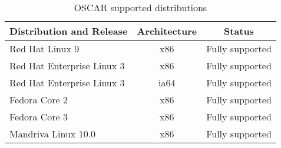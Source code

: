 %
%
%

\begin{table}[htbp]
  \begin{center}
    \begin{tabular}{|l|c|p{3in}|}
      \hline
      \multicolumn{1}{|c|}{Distribution and Release} &
      \multicolumn{1}{|c|}{Architecture} &
      \multicolumn{1}{|c|}{Status} \\
      \hline
      \hline
      Red Hat Linux 9 & x86 &Fully supported \\
%
      Red Hat Enterprise Linux 3 & x86 & Fully supported \\
%
      Red Hat Enterprise Linux 3 & ia64 & Fully supported \\
%
\hline
%
      Fedora Core 2 & x86 & Fully supported \\
      Fedora Core 3 & x86 & Fully supported \\
%
\hline
%
      Mandriva Linux 10.0 & x86 & Fully supported \\
%
\hline
%
    \end{tabular}
    \caption{OSCAR supported distributions}
    \label{tab:oscar-distro-support}
  \end{center}
\end{table}
